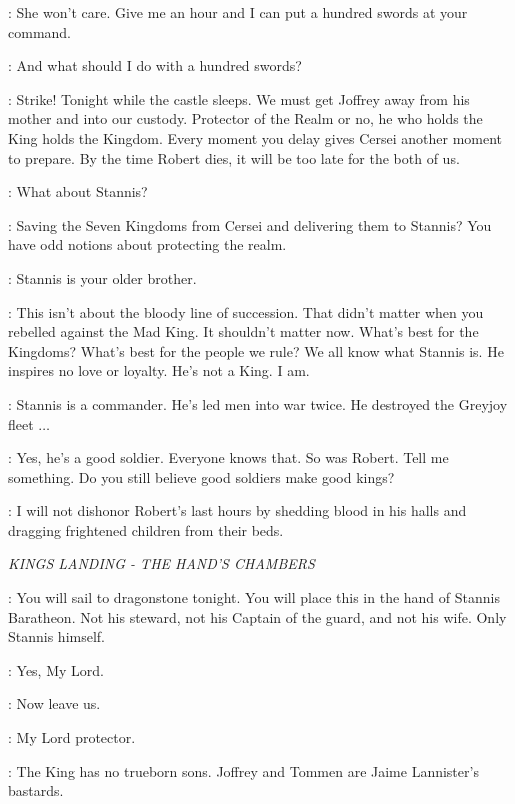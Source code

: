\RENLY: She won't care.  Give me an hour and I can put a hundred swords at your command. 

\NED: And what should I do with a hundred swords? 

\RENLY: Strike! Tonight while the castle sleeps.  We must get Joffrey away from his mother and into our custody.  Protector of the Realm or no, he who holds the King holds the Kingdom.  Every moment you delay gives Cersei another moment to prepare.  By the time Robert dies, it will be too late for the both of us. 

\NED: What about Stannis? 

\RENLY: Saving the Seven Kingdoms from Cersei and delivering them to Stannis?  You have odd notions about protecting the realm. 

\NED: Stannis is your older brother. 

\RENLY: This isn't about the bloody line of succession.  That didn't matter when you rebelled against the Mad King.  It shouldn't matter now.  What's best for the Kingdoms?  What's best for the people we rule?  We all know what Stannis is.  He inspires no love or loyalty.  He's not a King.  I am. 

\NED: Stannis is a commander.  He's led men into war twice.  He destroyed the Greyjoy fleet $\ldots$  

\RENLY: Yes, he's a good soldier. Everyone knows that.  So was Robert.  Tell me something.  Do you still believe good soldiers make good kings? 

\NED: I will not dishonor Robert's last hours by shedding blood in his halls and dragging frightened children from their beds. 


\scene

\textit{KINGS LANDING - THE HAND'S CHAMBERS} 


\NED: You will sail to dragonstone tonight. You will place this in the hand of Stannis Baratheon. Not his steward, not his Captain of the guard, and not his wife. Only Stannis himself. 

\BANNERMAN: Yes, My Lord. 


\NED: Now leave us. 

\LITTLEFINGER:  My Lord protector. 

\NED: The King has no trueborn sons. Joffrey and Tommen are Jaime Lannister's bastards. 


